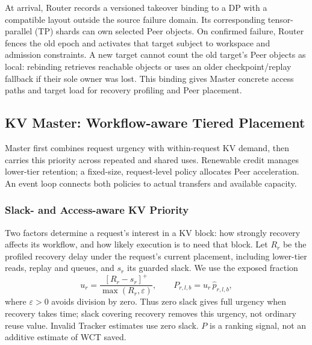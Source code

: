 At arrival, Router records a versioned takeover binding to a DP with a
compatible layout outside the source failure domain. Its corresponding
tensor-parallel (TP) shards can own selected Peer objects. On confirmed
failure, Router fences the old epoch and activates that target subject
to workspace and admission constraints. A new target cannot count the
old target's Peer objects as local: rebinding retrieves reachable objects
or uses an older checkpoint/replay fallback if their sole owner was lost.
This binding gives Master concrete access paths and target load for
recovery profiling and Peer placement.

\subsection{KV Master: Workflow-aware Tiered Placement}
\label{sec:kv-master}

Master first combines request urgency with within-request KV demand,
then carries this priority across repeated and shared uses. Renewable
credit manages lower-tier retention; a fixed-size, request-level policy
allocates Peer acceleration. An event loop connects both policies to
actual transfers and available capacity.

\subsubsection{Slack- and Access-aware KV Priority}
\label{sec:placement-value}
\label{sec:prefix-value}

Two factors determine a request's interest in a KV block:
how strongly recovery affects its workflow, and how likely execution is
to need that block. Let $R_r$ be the profiled recovery delay under the
request's current placement, including lower-tier reads, replay and
queues, and $s_r$ its guarded slack. We use the exposed fraction
\begin{equation}
 u_r=\frac{[R_r-s_r]^+}{\max(R_r,\varepsilon)},
 \qquad P_{r,l,b}=u_r\,\widehat p_{r,l,b},
 \label{eq:value}
\end{equation}
where $\varepsilon>0$ avoids division by zero. Thus zero slack gives full
urgency when recovery takes time; slack covering recovery removes this
urgency, not ordinary reuse value. Invalid Tracker estimates use zero
slack. $P$ is a ranking signal, not an additive estimate of WCT saved.

